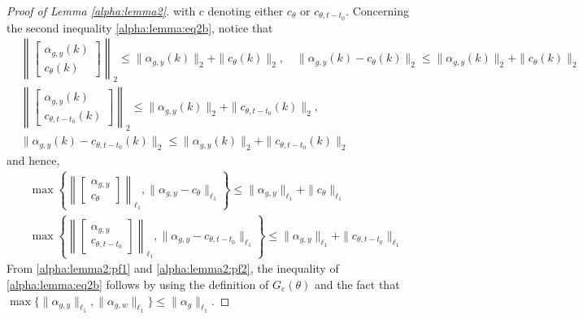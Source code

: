 \documentclass{article}
\begin{document}
\begin{proof}[Proof of Lemma  \ref{alpha:lemma2}]
 with $c$ denoting either $c_{\theta}$ or $c_{\theta,t-t_0}$. Concerning the second inequality \eqref{alpha:lemma:eq2b}, notice that
  \begin{subequations}\label{alpha:lemma2:pf0}    
  \begin{align}
    & \!\!\!\!\!\left\|\begin{bmatrix} \alpha_{g,y}(k) \\ c_{\theta}(k) \end{bmatrix}\right\|_2 \le \|\alpha_{g,y}(k)\|_2 + \|c_{\theta}(k)\|_2, \quad
    \|\alpha_{g,y}(k) - c_{\theta}(k)\|_2 \le \|\alpha_{g,y}(k)\|_2 + \|c_{\theta}(k)\|_2 \\
   & \left\|\begin{bmatrix} \alpha_{g,y}(k) \\ c_{\theta,t-t_0}(k) \end{bmatrix}\right\|_2 \le \|\alpha_{g,y}(k)\|_2 + \|c_{\theta,t-t_0}(k)\|_2,\\
    &\|\alpha_{g,y}(k) - c_{\theta,t-t_0}(k)\|_2 \le \|\alpha_{g,y}(k)\|_2 + \|c_{\theta,t-t_0}(k)\|_2 
  \end{align}
  \end{subequations}
  and hence,  
\begin{subequations}\label{alpha:lemma2:pf1}    
  \begin{align}
  &  \max\left\{\left\|\begin{bmatrix} \alpha_{g,y} \\ c_{\theta} \end{bmatrix}\right\|_{\ell_1}, \|\alpha_{g,y}-c_{\theta}\|_{\ell_1}\right\}
    \le \|\alpha_{g,y}\|_{\ell_1} + \|c_{\theta}\|_{\ell_1} \\
   & \max\left\{\left\|\begin{bmatrix} \alpha_{g,y} \\ c_{\theta,t-t_0} \end{bmatrix}\right\|_{\ell_1}, \|\alpha_{g,y}-c_{\theta,t-t_0}\|_{\ell_1}\right\}
    \le \|\alpha_{g,y}\|_{\ell_1} + \|c_{\theta,t-t_0}\|_{\ell_1}
  \end{align}
\end{subequations}
  From \eqref{alpha:lemma2:pf1} and \eqref{alpha:lemma2:pf2}, the inequality of \eqref{alpha:lemma:eq2b} follows
  by using the definition of $G_{e}(\theta)$ and the fact that $\max\{\|\alpha_{g,y}\|_{\ell_1}, \|\alpha_{g,w}\|_{\ell_1}\} \le \|\alpha_{g}\|_{\ell_1}$.


\end{proof}
\end{document}
